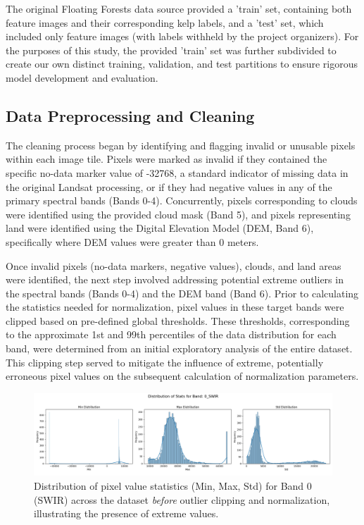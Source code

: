 \documentclass{article}
\begin{document}
The original Floating Forests data source provided a 'train' set, containing both feature images and their corresponding kelp labels, and a 'test' set, which included only feature images (with labels withheld by the project organizers). For the purposes of this study, the provided 'train' set was further subdivided to create our own distinct training, validation, and test partitions to ensure rigorous model development and evaluation.

\subsection{Data Preprocessing and Cleaning}

The cleaning process began by identifying and flagging invalid or unusable pixels within each image tile. Pixels were marked as invalid if they contained the specific no-data marker value of -32768, a standard indicator of missing data in the original Landsat processing, or if they had negative values in any of the primary spectral bands (Bands 0-4). Concurrently, pixels corresponding to clouds were identified using the provided cloud mask (Band 5), and pixels representing land were identified using the Digital Elevation Model (DEM, Band 6), specifically where DEM values were greater than 0 meters.

Once invalid pixels (no-data markers, negative values), clouds, and land areas were identified, the next step involved addressing potential extreme outliers in the spectral bands (Bands 0-4) and the DEM band (Band 6). Prior to calculating the statistics needed for normalization, pixel values in these target bands were clipped based on pre-defined global thresholds. These thresholds, corresponding to the approximate 1st and 99th percentiles of the data distribution for each band, were determined from an initial exploratory analysis of the entire dataset. This clipping step served to mitigate the influence of extreme, potentially erroneous pixel values on the subsequent calculation of normalization parameters. 

\begin{figure}[htbp]
    \centering
    \includegraphics[width=\textwidth]{distribution_0_SWIR_before.png} %
    \caption{Distribution of pixel value statistics (Min, Max, Std) for Band 0 (SWIR) across the dataset \textit{before} outlier clipping and normalization, illustrating the presence of extreme values.}
    \label{fig:stats_before}
\end{figure}
\end{document}
